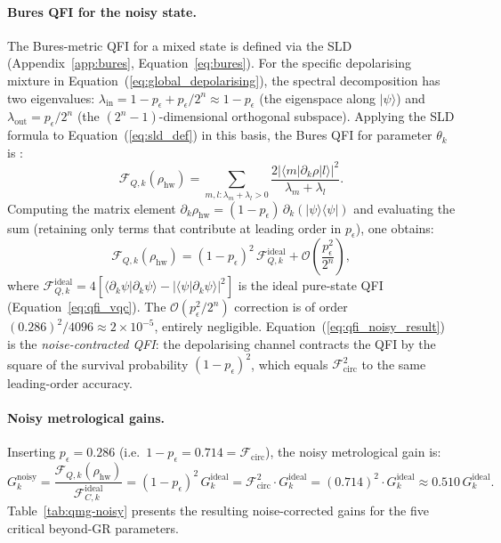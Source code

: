 \documentclass[11pt,a4paper, english]{book}
\theoremstyle{plain}
\theoremstyle{definition}
\numberwithin{equation}{chapter}
\numberwithin{figure}{chapter}
\numberwithin{table}{chapter}
\begin{document}
\paragraph{Bures QFI for the noisy state.}
The Bures-metric QFI for a mixed state is defined via the SLD
(Appendix~\ref{app:bures}, Equation~\ref{eq:bures}).  For the specific
depolarising mixture in Equation~(\ref{eq:global_depolarising}), the
spectral decomposition has two eigenvalues:
$\lambda_\mathrm{in} = 1-p_\epsilon + p_\epsilon/2^n \approx 1-p_\epsilon$
(the eigenspace along $|\psi\rangle$) and
$\lambda_\mathrm{out} = p_\epsilon/2^n$
(the $(2^n-1)$-dimensional orthogonal subspace).
Applying the SLD formula to Equation~(\ref{eq:sld_def}) in this basis, the
Bures QFI for parameter $\theta_k$ is \cite{Toth_2014_review}:
\begin{equation}
  \label{eq:bures_depol_qfi}
  \mathcal{F}_{Q,k}(\rho_\mathrm{hw})
  = \sum_{m,l: \lambda_m + \lambda_l > 0}
    \frac{2|\langle m|\partial_k\rho|l\rangle|^2}{\lambda_m + \lambda_l}.
\end{equation}
Computing the matrix element $\partial_k\rho_\mathrm{hw} =
(1-p_\epsilon)\,\partial_k(|\psi\rangle\langle\psi|)$ and evaluating the
sum (retaining only terms that contribute at leading order in $p_\epsilon$),
one obtains:
\begin{equation}
  \label{eq:qfi_noisy_result}
  \mathcal{F}_{Q,k}(\rho_\mathrm{hw})
  = (1-p_\epsilon)^2\,\mathcal{F}_{Q,k}^\mathrm{ideal}
  + \mathcal{O}\!\left(\frac{p_\epsilon^2}{2^n}\right),
\end{equation}
where $\mathcal{F}_{Q,k}^\mathrm{ideal} = 4\left[
\langle\partial_k\psi|\partial_k\psi\rangle
- |\langle\psi|\partial_k\psi\rangle|^2\right]$
is the ideal pure-state QFI (Equation~\ref{eq:qfi_vqc}).
The $\mathcal{O}(p_\epsilon^2/2^n)$ correction is of order
$(0.286)^2 / 4096 \approx 2\times10^{-5}$, entirely negligible.
Equation~(\ref{eq:qfi_noisy_result}) is the \emph{noise-contracted QFI}:
the depolarising channel contracts the QFI by the square of the
survival probability $(1-p_\epsilon)^2$, which equals
$\mathcal{F}_\mathrm{circ}^2$ to the same leading-order accuracy.

\paragraph{Noisy metrological gains.}
Inserting $p_\epsilon = 0.286$ (i.e.\ $1-p_\epsilon = 0.714 =
\mathcal{F}_\mathrm{circ}$), the noisy metrological gain is:
\begin{equation}
  \label{eq:noisy_gain}
  G_k^\mathrm{noisy}
  = \frac{\mathcal{F}_{Q,k}(\rho_\mathrm{hw})}
         {\mathcal{F}_{C,k}^\mathrm{ideal}}
  = (1-p_\epsilon)^2\,G_k^\mathrm{ideal}
  = \mathcal{F}_\mathrm{circ}^2 \cdot G_k^\mathrm{ideal}
  = (0.714)^2 \cdot G_k^\mathrm{ideal}
  \approx 0.510\,G_k^\mathrm{ideal}.
\end{equation}
Table~\ref{tab:qmg-noisy} presents the resulting noise-corrected gains
for the five critical beyond-GR parameters.
\end{document}
